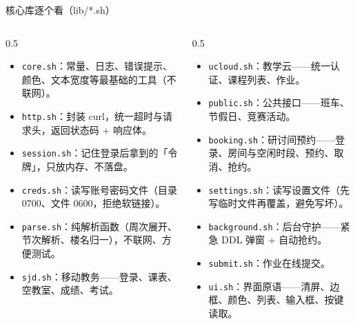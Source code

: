 \documentclass[aspectratio=169]{beamer}
\begin{document}
\begin{frame}{核心库逐个看（lib/*.sh）}
  \begin{columns}[T]
    \begin{column}{0.5\textwidth}
      \begin{itemize}
        \setlength\itemsep{0.35em}
        \item \texttt{core.sh}：常量、日志、错误提示、颜色、文本宽度等最基础的工具（不联网）。
        \item \texttt{http.sh}：封装 curl，统一超时与请求头，返回状态码 + 响应体。
        \item \texttt{session.sh}：记住登录后拿到的「令牌」，只放内存、不落盘。
        \item \texttt{creds.sh}：读写账号密码文件（目录 0700、文件 0600，拒绝软链接）。
        \item \texttt{parse.sh}：纯解析函数（周次展开、节次解析、楼名归一），不联网、方便测试。
        \item \texttt{sjd.sh}：移动教务——登录、课表、空教室、成绩、考试。
      \end{itemize}
    \end{column}
    \begin{column}{0.5\textwidth}
      \begin{itemize}
        \setlength\itemsep{0.35em}
        \item \texttt{ucloud.sh}：教学云——统一认证、课程列表、作业。
        \item \texttt{public.sh}：公共接口——班车、节假日、竞赛活动。
        \item \texttt{booking.sh}：研讨间预约——登录、房间与空闲时段、预约、取消、抢约。
        \item \texttt{settings.sh}：读写设置文件（先写临时文件再覆盖，避免写坏）。
        \item \texttt{background.sh}：后台守护——紧急 DDL 弹窗 + 自动抢约。
        \item \texttt{submit.sh}：作业在线提交。
        \item \texttt{ui.sh}：界面原语——清屏、边框、颜色、列表、输入框、按键读取。
      \end{itemize}
    \end{column}
  \end{columns}
\end{frame}
\end{document}
